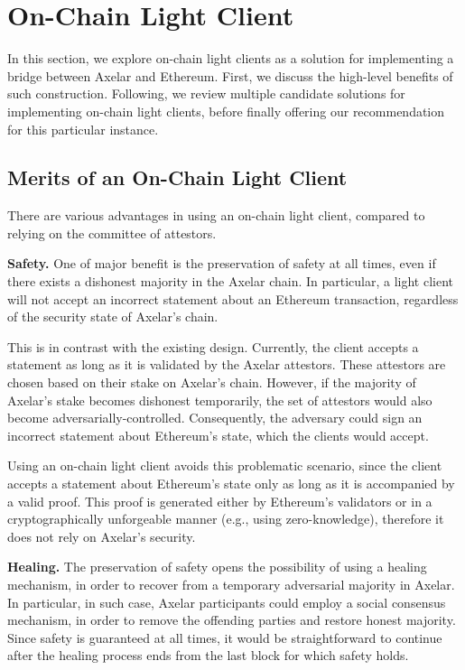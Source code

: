 \section{On-Chain Light Client}

In this section, we explore on-chain light clients as a solution for
implementing a bridge between Axelar and Ethereum. First, we discuss the
high-level benefits of such construction. Following, we review multiple
candidate solutions for implementing on-chain light clients, before finally
offering our recommendation for this particular instance.

\subsection{Merits of an On-Chain Light Client}

There are various advantages in using an on-chain light client, compared to
relying on the committee of attestors.

\noindent\textbf{Safety.}
One of major benefit is the preservation of safety at all times, even if there
exists a dishonest majority in the Axelar chain. In particular, a light client
will not accept an incorrect statement about an Ethereum transaction,
regardless of the security state of Axelar's chain.

This is in contrast with the existing design. Currently, the client accepts a
statement as long as it is validated by the Axelar attestors. These attestors
are chosen based on their stake on Axelar's chain. However, if the majority of
Axelar's stake becomes dishonest temporarily, the set of attestors would also
become adversarially-controlled. Consequently, the adversary could sign an
incorrect statement about Ethereum's state, which the clients would accept.

Using an on-chain light client avoids this problematic scenario, since the
client accepts a statement about Ethereum's state only as long as it is
accompanied by a valid proof. This proof is generated either by Ethereum's
validators or in a cryptographically unforgeable manner (e.g., using
zero-knowledge), therefore it does not rely on Axelar's security.

\noindent\textbf{Healing.}
The preservation of safety opens the possibility of using a healing mechanism,
in order to recover from a temporary adversarial majority in Axelar. In
particular, in such case, Axelar participants could employ a social consensus
mechanism, in order to remove the offending parties and restore honest
majority. Since safety is guaranteed at all times, it would be straightforward
to continue after the healing process ends from the last block for which safety
holds.

